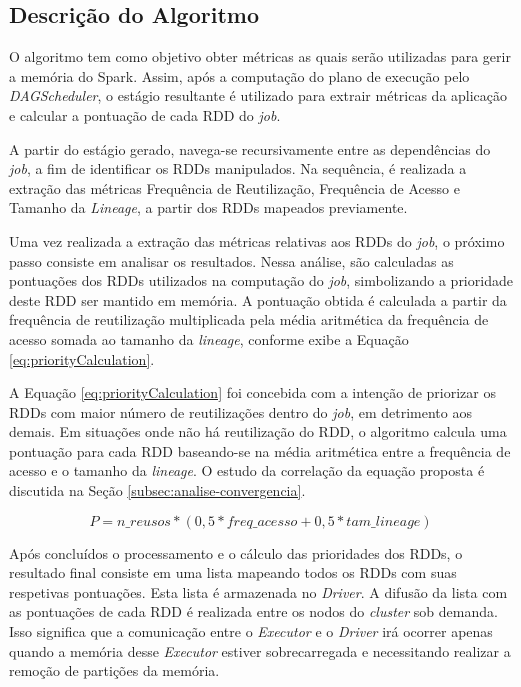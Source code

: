 \subsection{Descrição do Algoritmo}
O algoritmo tem como objetivo obter métricas as quais serão utilizadas para gerir a memória do Spark. Assim, após a computação do plano de execução pelo \textit{DAGScheduler}, o estágio resultante é utilizado para extrair métricas da aplicação e calcular a pontuação de cada RDD do \textit{job}. 

A partir do estágio gerado, navega-se recursivamente entre as dependências do \textit{job}, a fim de identificar os RDDs manipulados. Na sequência, é realizada a extração das métricas Frequência de Reutilização, Frequência de Acesso e Tamanho da \textit{Lineage}, a partir dos RDDs mapeados previamente.

Uma vez realizada a extração das métricas relativas aos RDDs do \textit{job}, o próximo passo consiste em analisar os resultados. Nessa análise, são calculadas as pontuações dos RDDs utilizados na computação do \textit{job}, simbolizando a prioridade deste RDD ser mantido em memória. A pontuação obtida é calculada a partir da frequência de reutilização multiplicada pela média aritmética da frequência de acesso somada ao tamanho da \textit{lineage}, conforme exibe a Equação \ref{eq:priorityCalculation}.

A Equação \ref{eq:priorityCalculation} foi concebida com a intenção de priorizar os RDDs com maior número de reutilizações dentro do \textit{job}, em detrimento aos demais. Em situações onde não há reutilização do RDD, o algoritmo calcula uma pontuação para cada RDD baseando-se na média aritmética entre a frequência de acesso e o tamanho da \textit{lineage}. O estudo da correlação da equação proposta é discutida na Seção \ref{subsec:analise-convergencia}.

\begin{equation}
    \label{eq:priorityCalculation}
    P = n\_reusos * (0,5 * freq\_acesso + 0,5 * tam\_lineage)
\end{equation}

Após concluídos o processamento e o cálculo das prioridades dos RDDs, o resultado final consiste em uma lista mapeando todos os RDDs com suas respetivas pontuações. Esta lista é armazenada no \textit{Driver}. A difusão da lista com as pontuações de cada RDD é realizada entre os nodos do \textit{cluster} sob demanda. Isso significa que a comunicação entre o \textit{Executor} e o \textit{Driver} irá ocorrer apenas quando a memória desse \textit{Executor} estiver sobrecarregada e necessitando realizar a remoção de partições da memória. 

